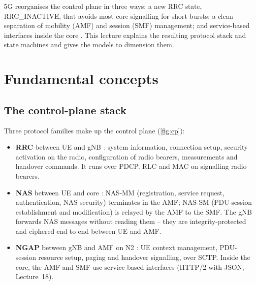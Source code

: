 \documentclass[11pt,a4paper]{article}
\begin{document}
5G reorganises the control plane in three ways: a new RRC state, RRC\_INACTIVE, that avoids most core signalling for short bursts; a clean
separation of mobility (AMF) and session (SMF) management; and service-based interfaces inside the core \cite{ts23501,ts38300}. This lecture
explains the resulting protocol stack and state machines and gives the models to dimension them.

\section{Fundamental concepts}

\subsection{The control-plane stack}
Three protocol families make up the control plane (\cref{fig:cp}):
\begin{itemize}
  \item \textbf{RRC} between UE and gNB \cite{ts38331}: system information, connection setup, security activation on the radio,
        configuration of radio bearers, measurements and handover commands. It runs over PDCP, RLC and MAC on signalling radio bearers.
  \item \textbf{NAS} between UE and core \cite{ts24501}: NAS-MM (registration, service request, authentication, NAS security) terminates in
        the AMF; NAS-SM (PDU-session establishment and modification) is relayed by the AMF to the SMF. The gNB forwards NAS messages without
        reading them -- they are integrity-protected and ciphered end to end between UE and AMF.
  \item \textbf{NGAP} between gNB and AMF on N2 \cite{ts38413}: UE context management, PDU-session resource setup, paging and handover
        signalling, over SCTP. Inside the core, the AMF and SMF use service-based interfaces (HTTP/2 with JSON, Lecture~18).
\end{itemize}

\begin{acnfigure}
  \caption{5G control-plane protocol stack: RRC on Uu, NGAP on N2, NAS end to end between UE and AMF/SMF, and SBI in the core.}
  \label{fig:cp}
\end{acnfigure}
\end{document}
